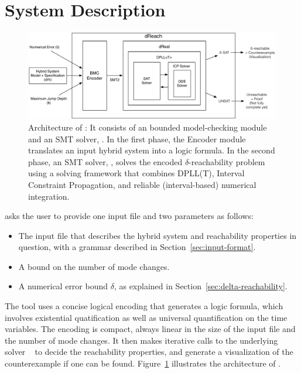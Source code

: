 \section{System Description}\label{sec:system}
\begin{figure}[!h]
  \centering
  \includegraphics[width=\textwidth]{images/dreach_archi}
  \caption{Architecture of \dReach{}: It consists of an bounded
    model-checking module and an SMT solver, \dReal{}. In the first
    phase, the Encoder module translates an input hybrid system into a
    logic formula. In the second phase, an
    SMT solver, \dReal{}, solves the encoded $\delta$-reachability
    problem using a solving framework that combines DPLL(T), Interval Constraint Propagation, and reliable (interval-based) numerical integration.
  }
  \label{fig:system-description}
\end{figure}
\dReach{} asks the user to provide one input file and two parameters as follows:
\begin{itemize}
\item The input file that describes the hybrid system and reachability
  properties in question, with a grammar described in
  Section~\ref{sec:input-format}.
\item A bound on the number of mode changes.
\item A numerical error bound $\delta$, as explained in Section~\ref{sec:delta-reachability}.
\end{itemize}

The tool uses a concise logical encoding that generates a logic formula, which involves existential quatification as well as universal quantification on the time variables. The encoding is compact, always linear in the size of the input file and the number of mode changes. It then makes iterative calls to the underlying solver \dReal{}~\cite{DBLP:conf/cade/GaoKC13} to decide the reachability properties, and generate a visualization of the counterexample if one can be found. Figure~\ref{fig:system-description} illustrates the architecture of
\dReach{}.

